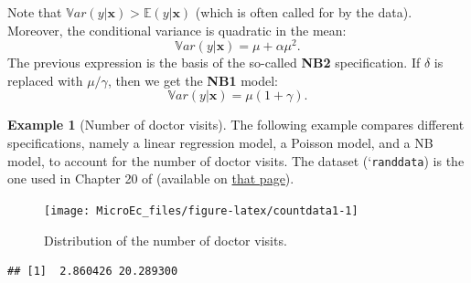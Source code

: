 \documentclass[
  12pt,
]{book}
\newenvironment{Shaded}{\begin{snugshade}}{\end{snugshade}}
\newcommand{\AttributeTok}[1]{\textcolor[rgb]{0.13,0.29,0.53}{#1}}
\newcommand{\CommentTok}[1]{\textcolor[rgb]{0.56,0.35,0.01}{\textit{#1}}}
\newcommand{\DecValTok}[1]{\textcolor[rgb]{0.00,0.00,0.81}{#1}}
\newcommand{\FunctionTok}[1]{\textcolor[rgb]{0.13,0.29,0.53}{\textbf{#1}}}
\newcommand{\NormalTok}[1]{#1}
\newcommand{\SpecialCharTok}[1]{\textcolor[rgb]{0.81,0.36,0.00}{\textbf{#1}}}
\theoremstyle{definition}
\theoremstyle{definition}
\newtheorem{example}{Example}[chapter]
\theoremstyle{definition}
\theoremstyle{definition}
\theoremstyle{remark}
\begin{document}
Note that \(\mathbb{V}ar(y|\mathbf{x}) > \mathbb{E}(y|\mathbf{x})\) (which is often called for by the data). Moreover, the conditional variance is quadratic in the mean:
\[
\mathbb{V}ar(y|\mathbf{x}) = \mu+\alpha \mu^2.
\]
The previous expression is the basis of the so-called \textbf{NB2} specification. If \(\delta\) is replaced with \(\mu/\gamma\), then we get the \textbf{NB1} model:
\[
\mathbb{V}ar(y|\mathbf{x}) = \mu(1+\gamma).
\]

\begin{example}[Number of doctor visits]
\protect\hypertarget{exm:Doctorvisits}{}\label{exm:Doctorvisits}The following example compares different specifications, namely a linear regression model, a Poisson model, and a NB model, to account for the number of doctor visits. The dataset (`\texttt{randdata}) is the one used in Chapter 20 of \citet{Cameron_Trivedi_2005} (available on \href{http://cameron.econ.ucdavis.edu/mmabook/mmadata.html}{that page}).

\begin{Shaded}
\end{Shaded}

\begin{figure}
\texttt{[image: MicroEc\_files/figure-latex/countdata1-1]} \caption{Distribution of the number of doctor visits.}\label{fig:countdata1}
\end{figure}

\begin{Shaded}
\end{Shaded}

\begin{verbatim}
## [1]  2.860426 20.289300
\end{verbatim}


\end{example}
\end{document}
